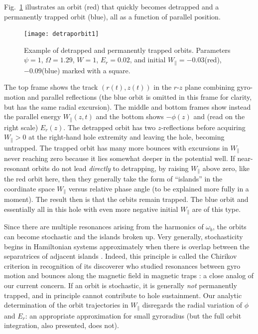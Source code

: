 \documentclass{agujournal2019}
\def\citep{\cite}
\begin{document}
Fig.\ \ref{fig:detraporbit1} illustrates an orbit (red) that quickly
becomes detrapped and a permanently trapped orbit (blue), all as a
function of parallel position.
\begin{figure}[htp]
  \centering
  \texttt{[image: detraporbit1]}
  \caption{Example of detrapped and permanently trapped
    orbits. Parameters $\psi=1$, $\Omega=1.29$, $W=1$, $E_r=0.02$,
    and initial $W_\parallel=-0.03$(red), $-0.09$(blue) marked with a
    square.
}
  \label{fig:detraporbit1}
\end{figure}
The top frame shows the track $(r(t),z(t))$ in the $r$-$z$ plane combining
gyro-motion and parallel reflections (the blue orbit is omitted in
this frame for clarity, but has the same radial excursion). The middle and
bottom frames show instead the parallel energy $W_\parallel(z,t)$ and the
bottom shows $-\phi(z)$ and (read on the right scale) $E_r(z)$. The
detrapped orbit has two $z$-reflections before acquiring
$W_\parallel>0$ at the right-hand hole extremity and leaving the hole,
becoming untrapped. The trapped orbit has many more bounces with
excursions in $W_\parallel$ never reaching zero because it lies
somewhat deeper in the potential well.  If near-resonant orbits do not
lead \emph{directly} to detrapping, by raising $W_\parallel$ above
zero, like the red orbit here, then they generally take the form of
``islands'' in the coordinate space $W_\parallel$ versus relative
phase angle (to be explained more fully in a moment). The result then
is that the orbits remain trapped.  The blue orbit and essentially all
in this hole with even more negative initial $W_\parallel$ are of this
type.

Since there are multiple resonances arising from the harmonics of
$\omega_b$, the orbits can become stochastic and the islands broken
up. Very generally, stochasticity begins in Hamiltonian systems
approximately when there is overlap between the separatrices of
adjacent islands \citep{Chirikov1979,Meiss1992}. Indeed, this
principle is called the Chirikov criterion in recognition of its
discoverer who studied resonances between gyro motion and bounces
along the magnetic field in magnetic traps \citep{Chirikov1960}: a
close analog of our current concern.  If an orbit is stochastic, it is
generally \emph{not} permanently trapped, and in principle cannot
contribute to hole sustainment. Our analytic determination of the
orbit trajectories in $W_\parallel$ disregards the radial variation
of $\phi$ and $E_r$: an appropriate approximation for small
gyroradius (but the full orbit integration, also presented, does not).
\end{document}
